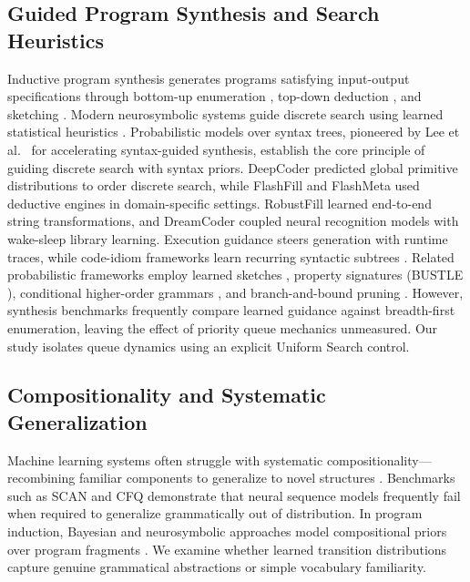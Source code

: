 \documentclass[10pt,twocolumn]{article}
\begin{document}
\subsection{Guided Program Synthesis and Search Heuristics}
Inductive program synthesis generates programs satisfying input-output specifications \cite{gulwani2017program, solar2008program, alur2013syntax, manna1980deductive} through bottom-up enumeration \cite{udupa2013transit}, top-down deduction \cite{feser2015synthesizing}, and sketching \cite{solar2008program}. Modern neurosymbolic systems guide discrete search using learned statistical heuristics \cite{chaudhuri2021neurosymbolic, gulwani2017program}. Probabilistic models over syntax trees, pioneered by Lee et al.~\cite{lee2018accelerating} for accelerating syntax-guided synthesis, establish the core principle of guiding discrete search with syntax priors. DeepCoder \cite{balog2017deepcoder} predicted global primitive distributions to order discrete search, while FlashFill \cite{gulwani2011automating} and FlashMeta \cite{polozov2015flashmeta} used deductive engines in domain-specific settings. RobustFill \cite{devlin2017robustfill} learned end-to-end string transformations, and DreamCoder \cite{ellis2021dreamcoder} coupled neural recognition models with wake-sleep library learning. Execution guidance \cite{chen2019execution} steers generation with runtime traces, while code-idiom frameworks learn recurring syntactic subtrees \cite{shin2019improving}. Related probabilistic frameworks employ learned sketches \cite{nye2020learning}, property signatures (BUSTLE \cite{odena2020learning}), conditional higher-order grammars \cite{ellis2021dreamcoder, menon2013compositional}, and branch-and-bound pruning \cite{lee2018accelerating, pearl1984heuristics}. However, synthesis benchmarks frequently compare learned guidance against breadth-first enumeration, leaving the effect of priority queue mechanics unmeasured. Our study isolates queue dynamics using an explicit Uniform Search control.

\subsection{Compositionality and Systematic Generalization}
Machine learning systems often struggle with systematic compositionality---recombining familiar components to generalize to novel structures \cite{fodor1988connectionism, marcus2001algebraic, hupkes2020compositionality}. Benchmarks such as SCAN \cite{lake2018generalization} and CFQ \cite{keysers2020measuring} demonstrate that neural sequence models frequently fail when required to generalize grammatically out of distribution. In program induction, Bayesian and neurosymbolic approaches model compositional priors over program fragments \cite{ellis2021dreamcoder, lake2015human, goodman2008church, dechter2013bootstrap, liang2010learning, andreas2019measuring}. We examine whether learned transition distributions capture genuine grammatical abstractions or simple vocabulary familiarity.
\end{document}
